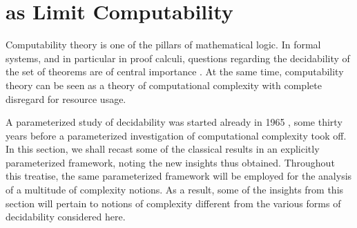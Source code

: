 \section{as Limit Computability}

Computability theory \parencite{rogers1967theory} is one of the pillars of mathematical logic.
In formal systems, and in particular in proof calculi, questions regarding the decidability of the set of theorems are of central importance \parencite{kleene1967mathematical}.
At the same time, computability theory can be seen as a theory of computational complexity with complete disregard for resource usage.

A parameterized study of decidability was started already in 1965 \parencite{putnam1965trial,gold1965limiting}, some thirty years before a parameterized investigation of computational complexity took off.
In this section, we shall recast some of the classical results in an explicitly parameterized framework, noting the new insights thus obtained.
Throughout this treatise, the same parameterized framework will be employed for the analysis of a multitude of complexity notions.
As a result, some of the insights from this section will pertain to notions of complexity different from the various forms of decidability considered here.

